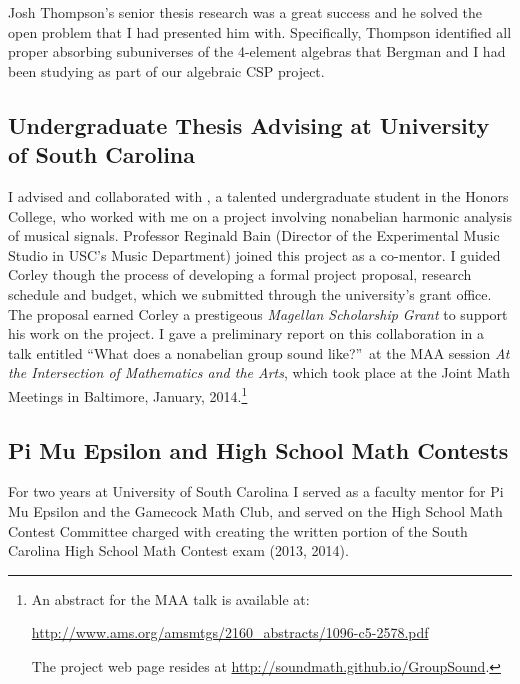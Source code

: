 Josh Thompson's senior thesis research was a great success and he solved the open problem that I had presented him with. Specifically, Thompson identified all proper absorbing subuniverses of the 4-element algebras that Bergman and I had been studying as part of our algebraic CSP project.

\subsection{Undergraduate Thesis Advising at University of South Carolina}
I advised and collaborated with , a talented undergraduate student in the Honors College, who worked with me on a project involving nonabelian harmonic analysis of musical signals.
Professor Reginald Bain (Director of the Experimental Music Studio in USC's Music Department) joined this project as a co-mentor. I guided Corley though the process of developing a formal project proposal,
research schedule and budget, which we submitted through the university's grant office. The proposal earned Corley a prestigeous \emph{Magellan Scholarship Grant} to support his work on the project.
I gave a preliminary report on this collaboration in a talk entitled ``What does a nonabelian group sound like?''~at the MAA session \emph{At the Intersection of Mathematics and the Arts}, which took place at the
Joint Math Meetings in Baltimore, January, 2014.\footnote{An abstract for the MAA talk is available at:

  \url{http://www.ams.org/amsmtgs/2160_abstracts/1096-c5-2578.pdf}

The project web page resides at \url{http://soundmath.github.io/GroupSound}.}

\subsection{Pi Mu Epsilon and High School Math Contests}
For two years at University of South Carolina I served as a faculty mentor for Pi Mu Epsilon and the Gamecock Math Club, and served on the High School Math Contest Committee charged with creating the written portion of the South Carolina High School Math Contest exam (2013, 2014).   

\pagestyle{fancy} 
 \lfoot{} \rfoot{\thepage} \cfoot{}

